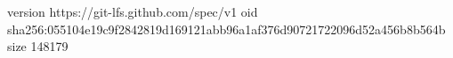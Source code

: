 version https://git-lfs.github.com/spec/v1
oid sha256:055104e19c9f2842819d169121abb96a1af376d90721722096d52a456b8b564b
size 148179
